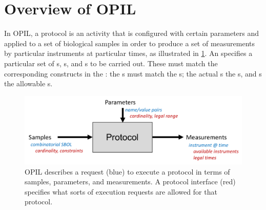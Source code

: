 \section{Overview of OPIL}

In OPIL, a protocol is an activity that is configured with certain parameters and applied to a set of biological samples in order to produce a set of measurements by particular instruments at particular times, as illustrated in \ref{f:overview}.
An  specifies a particular set of s, s, and s to be carried out. 
These must match the corresponding constructs in the :
the s must match the s; the actual s the \SampleSetSpec{}s, and s the allowable s.

\begin{figure}[ht]
\begin{center}
  \includegraphics[scale=0.75]{figures/overview.pdf}
\caption{OPIL describes a request (blue) to execute a protocol in terms of samples, parameters, and measurements. 
A protocol interface (red) specifies what sorts of execution requests are allowed for that protocol.}
\label{f:overview}
\end{center}
\end{figure}

